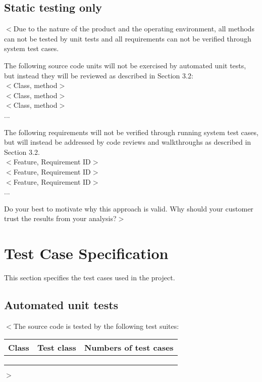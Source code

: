 \documentclass{scrreprt}
\begin{document}
\section{Static testing only}
$<$Due to the nature of the product and the operating environment, all methods can not be tested by unit tests and all requirements can not be verified through system test cases. 

The following source code units will not be exercised by automated unit tests, but instead they will be reviewed as described in Section 3.2:\\
$<$Class, method$>$\\
$<$Class, method$>$\\
$<$Class, method$>$\\
...

The following requirements will not be verified through running system test cases, but will instead be addressed by code reviews and walkthroughs as described in Section 3.2.\\
$<$Feature, Requirement ID$>$\\
$<$Feature, Requirement ID$>$\\
$<$Feature, Requirement ID$>$\\
...

Do your best to motivate why this approach is valid. Why should your customer trust the results from your analysis?$>$



\chapter{Test Case Specification}
This section specifies the test cases used in the project.

\section{Automated unit tests}
$<$The source code is tested by the following test suites:

\begin{center}
    \begin{tabular}{|c|c|c|}
        \hline
	    Class & Test class & Numbers of test cases\\
        \hline
	     &  &  \\
        \hline
	     &  &  \\
        \hline
         &  &  \\
        \hline
    \end{tabular}
\end{center}
$>$
\end{document}
